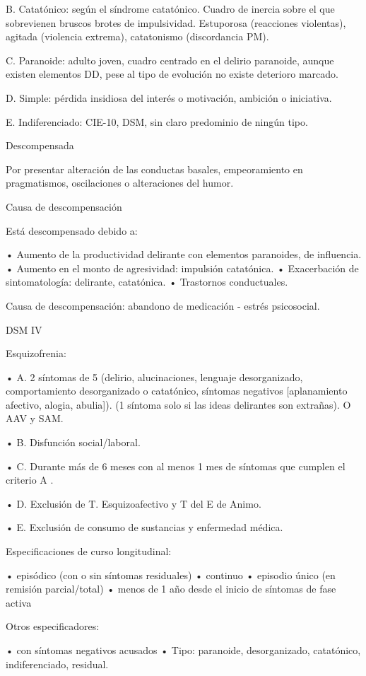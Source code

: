 B. Catatónico: según el síndrome catatónico. Cuadro de inercia sobre el que sobrevienen bruscos brotes de impulsividad. Estuporosa (reacciones violentas), agitada (violencia extrema), catatonismo (discordancia PM).

C. Paranoide: adulto joven, cuadro centrado en el delirio paranoide, aunque existen elementos DD, pese al tipo de evolución no existe deterioro marcado.

D. Simple: pérdida insidiosa del interés o motivación, ambición o iniciativa.

E. Indiferenciado: CIE-10, DSM, sin claro predominio de ningún tipo.

Descompensada

Por presentar alteración de las conductas basales, empeoramiento en pragmatismos, oscilaciones o alteraciones del humor.

Causa de descompensación

Está descompensado debido a:

• Aumento de la productividad delirante con elementos paranoides, de influencia.
• Aumento en el monto de agresividad: impulsión catatónica.
• Exacerbación de sintomatología: delirante, catatónica.
• Trastornos conductuales.

Causa de descompensación: abandono de medicación - estrés psicosocial.

DSM IV

Esquizofrenia:

• A. 2 síntomas de 5 (delirio, alucinaciones, lenguaje desorganizado, comportamiento desorganizado o catatónico, síntomas negativos [aplanamiento afectivo, alogia, abulia]). (1 síntoma solo si las ideas delirantes son extrañas). O AAV y SAM.

• B. Disfunción social/laboral.

• C. Durante más de 6 meses con al menos 1 mes de síntomas que cumplen el criterio A .

• D. Exclusión de T. Esquizoafectivo y T del E de Animo.

• E. Exclusión de consumo de sustancias y enfermedad médica.

Especificaciones de curso longitudinal:

• episódico (con o sin síntomas residuales)
• continuo
• episodio único (en remisión parcial/total)
• menos de 1 año desde el inicio de síntomas de fase activa

Otros especificadores:

• con síntomas negativos acusados
• Tipo: paranoide, desorganizado, catatónico, indiferenciado, residual.

